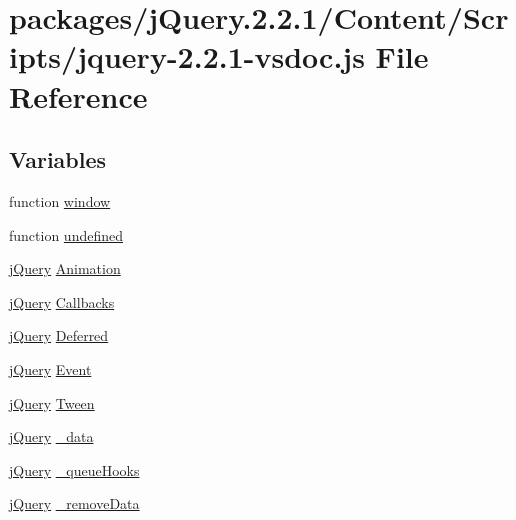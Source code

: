 \hypertarget{jquery-2_82_81-vsdoc_8js}{}\section{packages/j\+Query.2.2.1/\+Content/\+Scripts/jquery-\/2.2.1-\/vsdoc.js File Reference}
\label{jquery-2_82_81-vsdoc_8js}
\subsection*{Variables}
\begin{DoxyCompactItemize}
\item 
function \hyperlink{jquery-2_82_81-vsdoc_8js_a04a8a2bbfa9c15500892b8e5033d625b}{window}
\item 
function \hyperlink{jquery-2_82_81-vsdoc_8js_a08113a236cc18d2a9d5ce27e638012be}{undefined}
\item 
\hyperlink{jquery_8rateyo_8min_8js_a2b1d6f9c448e3ce72f4e1865d6e38d2c}{j\+Query} \hyperlink{jquery-2_82_81-vsdoc_8js_a3299b781c8ec8287357326920ab3565a}{Animation}
\item 
\hyperlink{jquery_8rateyo_8min_8js_a2b1d6f9c448e3ce72f4e1865d6e38d2c}{j\+Query} \hyperlink{jquery-2_82_81-vsdoc_8js_add8d59d25831bb9b171fdbee8a18795b}{Callbacks}
\item 
\hyperlink{jquery_8rateyo_8min_8js_a2b1d6f9c448e3ce72f4e1865d6e38d2c}{j\+Query} \hyperlink{jquery-2_82_81-vsdoc_8js_ab355ffd82371d88c17da7c1dae9e8829}{Deferred}
\item 
\hyperlink{jquery_8rateyo_8min_8js_a2b1d6f9c448e3ce72f4e1865d6e38d2c}{j\+Query} \hyperlink{jquery-2_82_81-vsdoc_8js_a2cc2bb482e56b47f47b4ee54d670a418}{Event}
\item 
\hyperlink{jquery_8rateyo_8min_8js_a2b1d6f9c448e3ce72f4e1865d6e38d2c}{j\+Query} \hyperlink{jquery-2_82_81-vsdoc_8js_a91e55267cc469e865a6a7c6cfc51c7b1}{Tween}
\item 
\hyperlink{jquery_8rateyo_8min_8js_a2b1d6f9c448e3ce72f4e1865d6e38d2c}{j\+Query} \hyperlink{jquery-2_82_81-vsdoc_8js_a01a70510ea17cfcb22c0ca5e079baf8c}{\+\_\+data}
\item 
\hyperlink{jquery_8rateyo_8min_8js_a2b1d6f9c448e3ce72f4e1865d6e38d2c}{j\+Query} \hyperlink{jquery-2_82_81-vsdoc_8js_ac896bda626b829bf9f8560a239e8f20b}{\+\_\+queue\+Hooks}
\item 
\hyperlink{jquery_8rateyo_8min_8js_a2b1d6f9c448e3ce72f4e1865d6e38d2c}{j\+Query} \hyperlink{jquery-2_82_81-vsdoc_8js_af9946bf86d7cfbcc033908182d2358a9}{\+\_\+remove\+Data}

\end{DoxyCompactItemize}

